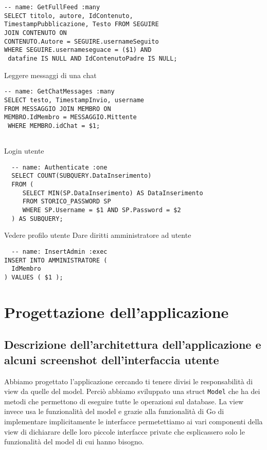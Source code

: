 \documentclass[a4paper,12pt]{report}
\begin{document}
\begin{lstlisting}
-- name: GetFullFeed :many
SELECT titolo, autore, IdContenuto, 
TimestampPubblicazione, Testo FROM SEGUIRE 
JOIN CONTENUTO ON 
CONTENUTO.Autore = SEGUIRE.usernameSeguito  
WHERE SEGUIRE.usernameseguace = ($1) AND
 datafine IS NULL AND IdContenutoPadre IS NULL;
\end{lstlisting}

Leggere messaggi di una chat
\begin{lstlisting}
-- name: GetChatMessages :many
SELECT testo, TimestampInvio, username 
FROM MESSAGGIO JOIN MEMBRO ON 
MEMBRO.IdMembro = MESSAGGIO.Mittente
 WHERE MEMBRO.idChat = $1;
 
\end{lstlisting}

Login utente
\begin{lstlisting}
  -- name: Authenticate :one
  SELECT COUNT(SUBQUERY.DataInserimento)
  FROM (
     SELECT MIN(SP.DataInserimento) AS DataInserimento
     FROM STORICO_PASSWORD SP 
     WHERE SP.Username = $1 AND SP.Password = $2
  ) AS SUBQUERY;
\end{lstlisting}

Vedere profilo utente
Dare diritti amministratore ad utente
\begin{lstlisting}
  -- name: InsertAdmin :exec
INSERT INTO AMMINISTRATORE (
  IdMembro
) VALUES ( $1 );
\end{lstlisting}

\chapter{Progettazione dell'applicazione}
\section{Descrizione dell'architettura dell'applicazione e alcuni screenshot dell'interfaccia utente}
Abbiamo progettato l'applicazione cercando ti tenere divisi le responsabilità di view da quelle del model. Perciò abbiamo sviluppato una struct \texttt{Model} che ha dei metodi che permettono di eseguire tutte le operazioni sul database. La view invece usa le funzionalità del model e grazie alla funzionalità di Go di implementare implicitamente le interfacce permetettiamo ai vari componenti della view di dichiarare delle loro piccole interfacce private che esplicassero solo le funzionalità del model di cui hanno bisogno.  
\end{document}
